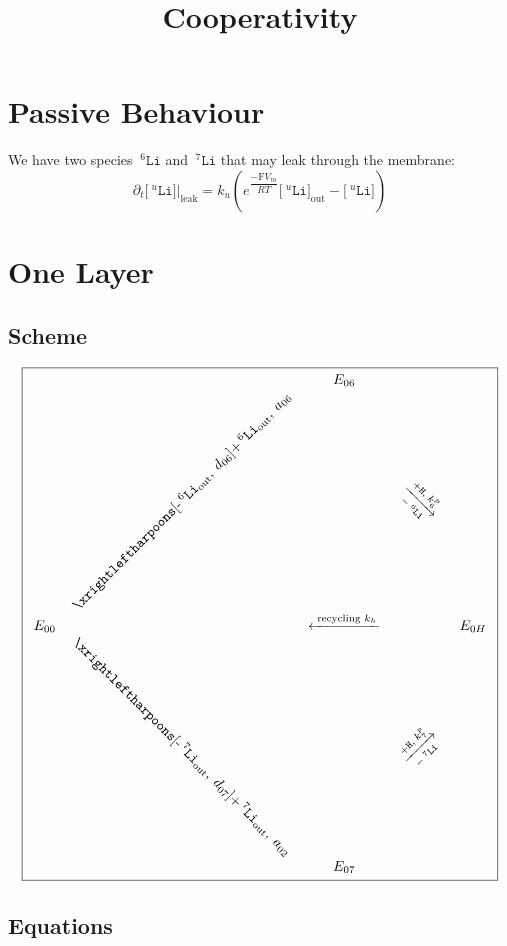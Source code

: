 \documentclass[aps,onecolumn,11pt]{revtex4}
\newcommand{\mychem}[1]{\mathtt{#1}}
\newcommand{\myconc}[1]{\big[#1\big]}
\newcommand{\Faraday}{\mathrm{F}}
\newcommand{\spLi}[1]{{\!~^{#1}\mychem{Li}}}
\newcommand{\Li}[1]{\myconc{\spLi{#1}}}
\newcommand{\spproton}{\mychem{H}}
\newcommand{\myleak}[1]{\left.{#1}\right\vert_{\mathrm{leak}}}
\newcommand{\myout}[1]{{#1}_{\mathrm{out}}}
\newcommand{\LiOut}[1]{\myout{\Li{#1}}}
\newcommand{\spLiOut}[1]{\myout{\spLi{#1}}}
\newcommand{\myrotate}[2]{\rotatebox[origin=c]{#1}{#2}}
\newcommand{\outLi}[1]{\text{-}\spLiOut{#1}}
\begin{document}
\title{Cooperativity}
\maketitle

\section{Passive Behaviour}
We have two species $\spLi{6}$ and $\spLi{7}$ that may leak through the membrane:
\begin{equation}
	\partial_t \myleak{\Li{u}} = k_u \left( e^{\dfrac{-\Faraday V_m }{RT}} \LiOut{u} - \Li{u}\right)
\end{equation}

\section{One Layer}

\subsection{Scheme}
{
\Large
\begin{equation}
\boxed{
\begin{array}{ccccc}
 & & E_{06}  &  & \\
 &  \myrotate{45}{$\xrightleftharpoons[\outLi{6},\;d_{06}]{+\spLiOut{6},\;a_{06}}$} &   & \myrotate{-45}{$\xrightarrow[-\spLi{6}]{+ \spproton, \; k^p_6}$} &  \\
E_{00}  &  & \xleftarrow{\text{ recycling } k_h } &   & E_{0H} \\
  & \myrotate{-45}{$\xrightleftharpoons[\outLi{7},\;d_{07}]{+\spLiOut{7},\;a_{02}}$} &   & \myrotate{+45}{$\xrightarrow[-\spLi{7}]{+ \spproton, \; k^p_7}$} & \\
 & & E_{07} & & \\
 \end{array}
 }
\end{equation}
}

\subsection{Equations}
\end{document}
